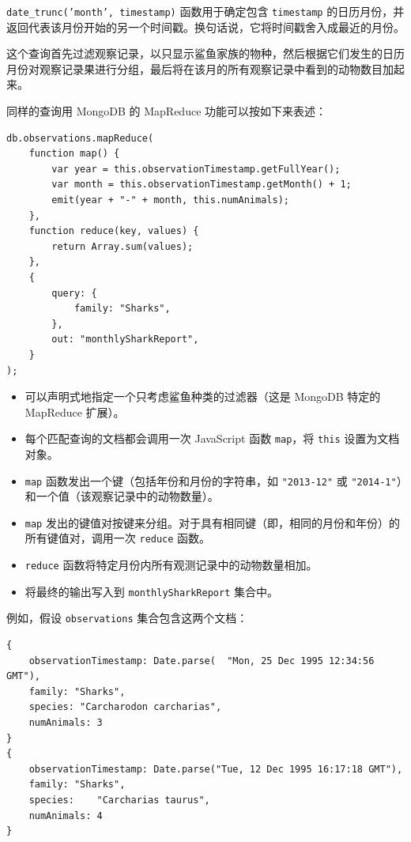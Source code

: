 \texttt{date\_trunc('month', timestamp)} 函数用于确定包含 \texttt{timestamp} 的日历月份，并返回代表该月份开始的另一个时间戳。换句话说，它将时间戳舍入成最近的月份。

这个查询首先过滤观察记录，以只显示鲨鱼家族的物种，然后根据它们发生的日历月份对观察记录果进行分组，最后将在该月的所有观察记录中看到的动物数目加起来。

同样的查询用 MongoDB 的 MapReduce 功能可以按如下来表述：

\begin{lstlisting}
db.observations.mapReduce(
    function map() {
        var year = this.observationTimestamp.getFullYear();
        var month = this.observationTimestamp.getMonth() + 1;
        emit(year + "-" + month, this.numAnimals);
    },
    function reduce(key, values) {
        return Array.sum(values);
    },
    {
        query: {
            family: "Sharks",
        },
        out: "monthlySharkReport",
    }
); 
\end{lstlisting}

\begin{itemize}
    \item 可以声明式地指定一个只考虑鲨鱼种类的过滤器（这是 MongoDB 特定的 MapReduce 扩展）。
    \item 每个匹配查询的文档都会调用一次 JavaScript 函数 \texttt{map}，将 \texttt{this} 设置为文档对象。
    \item \texttt{map} 函数发出一个键（包括年份和月份的字符串，如 \texttt{"2013-12"} 或 \texttt{"2014-1"}）和一个值（该观察记录中的动物数量）。
    \item \texttt{map} 发出的键值对按键来分组。对于具有相同键（即，相同的月份和年份）的所有键值对，调用一次 \texttt{reduce} 函数。
    \item \texttt{reduce} 函数将特定月份内所有观测记录中的动物数量相加。
    \item 将最终的输出写入到 \texttt{monthlySharkReport} 集合中。
\end{itemize}

例如，假设 \texttt{observations} 集合包含这两个文档：

\begin{lstlisting}
{
    observationTimestamp: Date.parse(  "Mon, 25 Dec 1995 12:34:56 GMT"),
    family: "Sharks",
    species: "Carcharodon carcharias",
    numAnimals: 3
}
{
    observationTimestamp: Date.parse("Tue, 12 Dec 1995 16:17:18 GMT"),
    family: "Sharks",
    species:    "Carcharias taurus",
    numAnimals: 4
}
\end{lstlisting}

